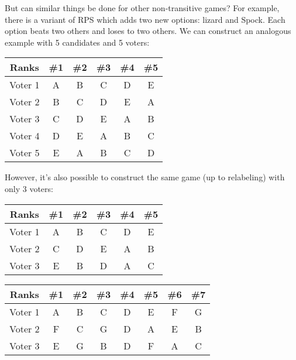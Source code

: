 \documentclass{article}
\begin{document}
But can similar things be done for other non-transitive games?
For example, there is a variant of RPS
which adds two new options: lizard and Spock.
Each option beats two others and loses to two others.
We can construct an analogous example with 5 candidates and 5 voters:

\begin{center}
  \begin{tabular}{|c|c c c c c|}
    \hline
    Ranks & \#1 & \#2 & \#3 & \#4 & \#5 \\ \hline
    Voter 1 & A & B & C & D & E \\ \hline
    Voter 2 & B & C & D & E & A \\ \hline
    Voter 3 & C & D & E & A & B \\ \hline
    Voter 4 & D & E & A & B & C \\ \hline
    Voter 5 & E & A & B & C & D \\ \hline
  \end{tabular}
\end{center}
However, it's also possible to construct the same game (up to relabeling)
with only 3 voters:
\begin{center}
  \begin{tabular}{|c|c c c c c|}
    \hline
    Ranks & \#1 & \#2 & \#3 & \#4 & \#5 \\ \hline
    Voter 1 & A & B & C & D & E \\ \hline
    Voter 2 & C & D & E & A & B \\ \hline
    Voter 3 & E & B & D & A & C \\ \hline    
  \end{tabular}
\end{center}

\begin{center}
  \begin{tabular}{|c|c c c c c c c|}
    \hline
    Ranks & \#1 & \#2 & \#3 & \#4 & \#5 & \#6 & \#7 \\ \hline
    Voter 1 & A & B & C & D & E & F & G \\ \hline
    Voter 2 & F & C & G & D & A & E & B \\ \hline
    Voter 3 & E & G & B & D & F & A & C \\ \hline
  \end{tabular}
\end{center}
\end{document}
